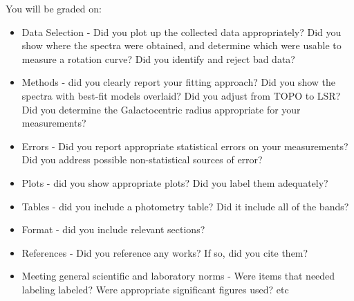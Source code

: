 \documentclass[11pt]{article}
\begin{document}
You will be graded on:
\begin{itemize}
    \item Data Selection - Did you plot up the collected data appropriately?  Did you show
        where the spectra were obtained, and determine which were usable to measure a rotation curve?
        Did you identify and reject bad data?
    \item Methods - did you clearly report your fitting approach?  Did you show the
        spectra with best-fit models overlaid?  Did you adjust from TOPO to LSR?
        Did you determine the Galactocentric radius appropriate for your measurements?
    \item Errors - Did you report appropriate statistical errors on your measurements?
        Did you address possible non-statistical sources of error?
    \item Plots - did you show appropriate plots?  Did you label them adequately?
    \item Tables - did you include a photometry table?  Did it include all of the bands?
    \item Format - did you include relevant sections? 
    \item References - Did you reference any works?   If so, did you cite them?
    \item Meeting general scientific and laboratory norms - Were items that needed labeling labeled?
        Were appropriate significant figures used? etc
\end{itemize}
\end{document}
